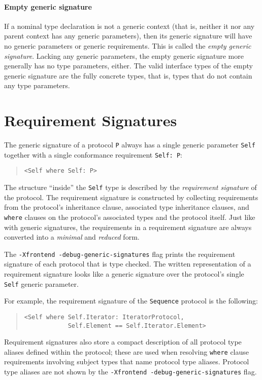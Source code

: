 \documentclass[a4paper,headsepline,bibliography=totoc,toc=flat,fleqn,twoside=semi]{scrbook}
\theoremstyle{definition}
\theoremstyle{definition}
\theoremstyle{definition}
\begin{document}
\paragraph{Empty generic signature}
If a nominal type declaration is not a generic context (that is, neither it nor any parent context has any generic parameters), then its generic signature will have no generic parameters or generic requirements. This is called the \emph{empty generic signature}. Lacking any generic parameters, the empty generic signature more generally has no type parameters, either. The valid interface types of the empty generic signature are the fully concrete types, that is, types that do not contain any type parameters.

\section{Requirement Signatures}\label{requirement sig}
The generic signature of a protocol \texttt{P} always has a single generic parameter \texttt{Self} together with a single conformance requirement \texttt{Self:\ P}:
\begin{quote}
\begin{verbatim}
<Self where Self: P>
\end{verbatim}
\end{quote}
The structure ``inside'' the \texttt{Self} type is described by the \emph{requirement signature} of the protocol. The requirement signature is constructed by collecting requirements from the protocol's inheritance clause, associated type inheritance clauses, and \texttt{where} clauses on the protocol's associated types and the protocol itself. Just like with generic signatures, the requirements in a requirement signature are always converted into a \emph{minimal} and \emph{reduced} form.

The \texttt{-Xfrontend -debug-generic-signatures} flag prints the requirement signature of each protocol that is type checked. The written representation of a requirement signature looks like a generic signature over the protocol's single \texttt{Self} generic parameter.

For example, the requirement signature of the \texttt{Sequence} protocol is the following:
\begin{quote}
\begin{verbatim}
<Self where Self.Iterator: IteratorProtocol,
            Self.Element == Self.Iterator.Element>
\end{verbatim}
\end{quote}
Requirement signatures also store a compact description of all protocol type aliases defined within the protocol; these are used when resolving \texttt{where} clause requirements involving subject types that name protocol type aliases. Protocol type aliases are not shown by the \texttt{-Xfrontend -debug-generic-signatures} flag.
\end{document}
